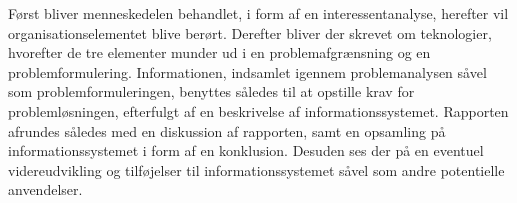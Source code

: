Først bliver menneskedelen behandlet, i form af en interessentanalyse, herefter  vil organisationselementet blive berørt.
Derefter bliver der skrevet om teknologier, hvorefter de tre elementer munder ud i en problemafgrænsning og en problemformulering.
Informationen, indsamlet igennem problemanalysen såvel som problemformuleringen, benyttes således til at opstille krav for problemløsningen, efterfulgt af en beskrivelse af informationssystemet. 
Rapporten afrundes således med en diskussion af rapporten, samt en opsamling på informationssystemet i form af en konklusion. Desuden ses der på en eventuel videreudvikling og tilføjelser til informationssystemet såvel som andre potentielle anvendelser.